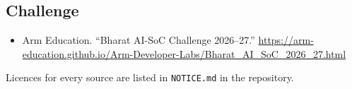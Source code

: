 \documentclass[11pt,a4paper]{article}
\begin{document}
\subsection*{Challenge}

\begin{itemize}[label={},leftmargin=2.4em,labelsep=0.45em,itemsep=0.3em]
  \item[{[18]}] Arm Education. ``Bharat AI-SoC Challenge 2026--27.'' \url{https://arm-education.github.io/Arm-Developer-Labs/Bharat_AI_SoC_2026_27.html}
\end{itemize}

\vspace{0.8em}
\noindent\small Licences for every source are listed in \texttt{NOTICE.md} in the repository.
\end{document}
